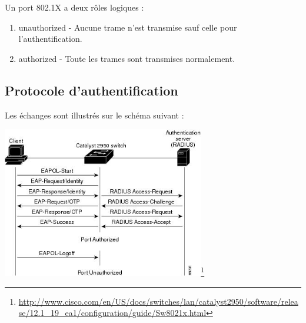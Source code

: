 Un port 802.1X a deux rôles logiques :
\begin{enumerate}
\item unauthorized - Aucune trame n'est transmise sauf celle pour l'authentification.
\item authorized - Toute les trames sont transmises normalement.
\end{enumerate}

\subsection{Protocole d'authentification}

Les échanges sont illustrés sur le schéma suivant :\\
\begin{center}
\includegraphics[width=250pt]{img/authentification.jpg}\footnote{\url{http://www.cisco.com/en/US/docs/switches/lan/catalyst2950/software/release/12.1_19_ea1/configuration/guide/Sw8021x.html}}
\end{center}


